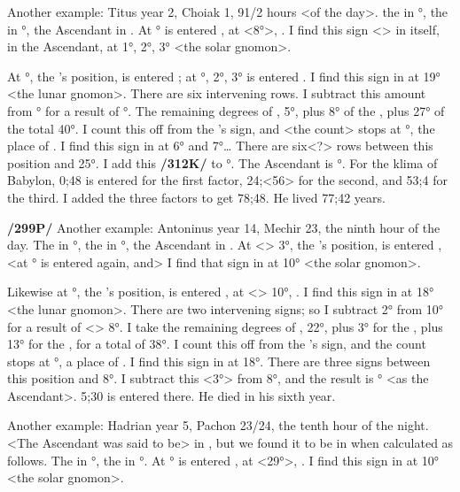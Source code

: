 Another example: Titus year 2, Choiak 1, 91/2 hours <of the day>. the \Sun\xspace in \Sagittarius\xspace 8°, the \Moon\xspace in \Taurus\xspace 27°, the Ascendant in \Taurus. At \Sagittarius\xspace 8° is entered \Cancer, at \Cancer\xspace <8°>, \Taurus. I find this sign <\Taurus> in itself, in the Ascendant, at 1°, 2°, 3° <the solar gnomon>. 

At \Taurus\xspace 27°, the \Moon’s position, is entered \Aries; at \Aries\xspace 1°, 2°, 3° is entered \Leo. I find this sign in \Taurus at 19° <the lunar gnomon>. There are six intervening rows. I subtract this amount from \Taurus\xspace 1° for a result of \Aries\xspace 25°. The remaining degrees of \Aries, 5°, plus 8° of the \Sun, plus 27° of the \Moon\xspace total 40°. I count this off from the \Moon’s sign, and <the count> stops at \Gemini\xspace 10°, the place of \Sagittarius. I find this sign in \Aries\xspace at 6° and 7°… There are six<?> rows between this position and 25°. I add this \textbf{/312K/} to \Aries\xspace 25°. The Ascendant is \Taurus\xspace 1°. For the klima of Babylon, 0;48 is entered for the first factor, 24;<56> for the second, and 53;4 for the third. I added the three factors to get 78;48. He lived 77;42 years.

\textbf{/299P/} Another example: Antoninus year 14, Mechir 23, the ninth hour of the day. The \Sun\xspace in \Pisces\xspace 3°, the \Moon\xspace in \Leo\xspace 13°, the Ascendant in \Cancer. At <\Pisces> 3°, the \Sun’s position, is entered \Pisces, <at \Pisces\xspace 3° is entered \Pisces\xspace again, and> I find that sign in \Cancer\xspace at 10° <the solar gnomon>.

Likewise at \Leo\xspace 13°, the \Moon’s position, is entered \Aquarius, at <\Aquarius> 10°, \Libra. I find this sign in \Cancer\xspace at 18° <the lunar gnomon>. There are two intervening signs; so I subtract 2° from 10° for a result of <\Cancer> 8°. I take the remaining degrees of \Cancer, 22°, plus 3° for the \Sun, plus 13° for the \Moon, for a total of 38°. I count this off from the \Moon’s sign, and the count stops at \Virgo\xspace 8°, a place of \Libra. I find this sign in \Cancer\xspace at 18°. There are three signs between this position and 8°. I subtract this <3°> from 8°, and the result is \Cancer\xspace 5° <as the Ascendant>. 5;30 is entered there. He died in his sixth year.

Another example: Hadrian year 5, Pachon 23/24, the tenth hour of the night. <The Ascendant was said to be> in \Capricorn, but we found it to be in \Aquarius\xspace when calculated as follows. The \Sun\xspace in \Taurus\xspace 29°, the \Moon\xspace in \Scorpio\xspace 15°. At \Taurus\xspace 29° is entered \Scorpio, at \Scorpio\xspace <29°>, \Libra. I find this sign in \Aquarius\xspace at 10° <the solar gnomon>. 

